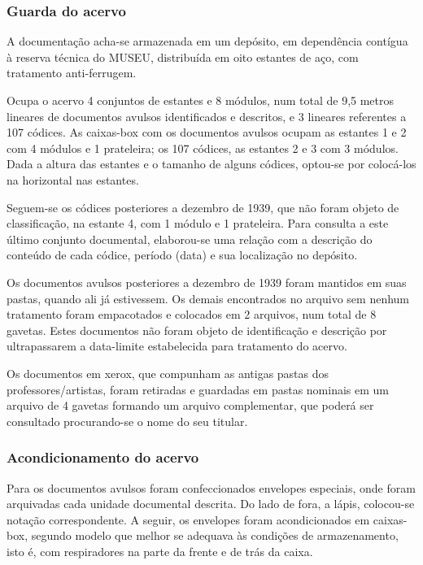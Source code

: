\subsubsection{Guarda do acervo}

A documentação acha-se armazenada em um depósito, em dependência contígua à reserva técnica do MUSEU, distribuída em oito estantes de aço, com tratamento anti-ferrugem.

Ocupa o acervo 4 conjuntos de estantes e 8 módulos, num total de 9,5 metros lineares de documentos avulsos identificados e descritos, e 3 lineares referentes a 107 códices. As caixas-box com os documentos avulsos ocupam as estantes 1 e 2 com 4 módulos e 1 prateleira; os 107 códices, as estantes 2 e 3 com 3 módulos. Dada a altura das estantes e o tamanho de alguns códices, optou-se por colocá-los na horizontal nas estantes. 

Seguem-se os códices posteriores a dezembro de 1939, que não foram objeto de classificação, na estante 4, com 1 módulo e 1 prateleira. Para consulta a este último conjunto documental, elaborou-se uma relação com a descrição do conteúdo de cada códice, período (data) e sua localização no depósito.

Os documentos avulsos posteriores a dezembro de 1939 foram mantidos em suas pastas, quando ali já estivessem. Os demais encontrados no arquivo sem nenhum tratamento foram empacotados e colocados em 2 arquivos, num total de 8 gavetas. Estes documentos não foram objeto de identificação e descrição por ultrapassarem a data-limite estabelecida para tratamento do acervo.

Os documentos em xerox, que compunham as antigas pastas dos professores/artistas, foram retiradas e guardadas em pastas nominais em um arquivo de 4 gavetas formando um arquivo complementar, que poderá ser consultado procurando-se o nome do seu titular.

\subsubsection{Acondicionamento do acervo}

Para os documentos avulsos foram confeccionados envelopes especiais, onde foram arquivadas cada unidade documental descrita. Do lado de fora, a lápis, colocou-se notação correspondente. A seguir, os envelopes foram acondicionados em caixas-box, segundo modelo que melhor se adequava às condições de armazenamento, isto é, com respiradores na parte da frente e de trás da caixa. 

